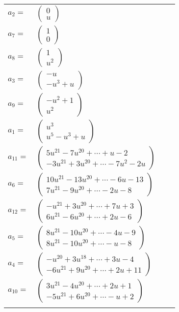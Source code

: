 \documentclass[1p]{elsarticle_modified}
\theoremstyle{definition}
\begin{document}
\begin{tabular}{m{7pt} m{180pt} m{7pt} m{180pt} }
\flushright $a_{2}=$&$\begin{pmatrix}0\\u\end{pmatrix}$ \\
\flushright $a_{7}=$&$\begin{pmatrix}1\\0\end{pmatrix}$ \\
\flushright $a_{8}=$&$\begin{pmatrix}1\\u^2\end{pmatrix}$ \\
\flushright $a_{3}=$&$\begin{pmatrix}- u\\- u^3+u\end{pmatrix}$ \\
\flushright $a_{9}=$&$\begin{pmatrix}- u^2+1\\u^2\end{pmatrix}$ \\
\flushright $a_{1}=$&$\begin{pmatrix}u^3\\u^5- u^3+u\end{pmatrix}$ \\
\flushright $a_{11}=$&$\begin{pmatrix}5 u^{21}-7 u^{20}+\cdots+u-2\\-3 u^{21}+3 u^{20}+\cdots-7 u^2-2 u\end{pmatrix}$ \\
\flushright $a_{6}=$&$\begin{pmatrix}10 u^{21}-13 u^{20}+\cdots-6 u-13\\7 u^{21}-9 u^{20}+\cdots-2 u-8\end{pmatrix}$ \\
\flushright $a_{12}=$&$\begin{pmatrix}- u^{21}+3 u^{20}+\cdots+7 u+3\\6 u^{21}-6 u^{20}+\cdots+2 u-6\end{pmatrix}$ \\
\flushright $a_{5}=$&$\begin{pmatrix}8 u^{21}-10 u^{20}+\cdots-4 u-9\\8 u^{21}-10 u^{20}+\cdots- u-8\end{pmatrix}$ \\
\flushright $a_{4}=$&$\begin{pmatrix}- u^{20}+3 u^{18}+\cdots+3 u-4\\-6 u^{21}+9 u^{20}+\cdots+2 u+11\end{pmatrix}$ \\
\flushright $a_{10}=$&$\begin{pmatrix}3 u^{21}-4 u^{20}+\cdots+2 u+1\\-5 u^{21}+6 u^{20}+\cdots- u+2\end{pmatrix}$\\&\end{tabular}
\end{document}
